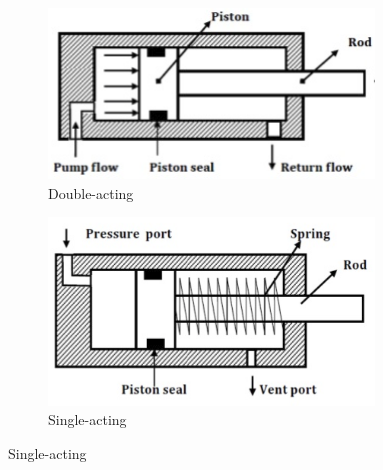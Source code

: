 \begin{figure}[H]
	\begin{subfigure}[b]{.45\linewidth}
		\includegraphics[width=0.95\textwidth]{imgs/piston_doubleact.png}
		\caption{Double-acting}
	\end{subfigure}
	\begin{subfigure}[b]{.45\linewidth}
		\includegraphics[width=0.95\textwidth]{imgs/piston_singleact.png}
		\caption{Single-acting}
	\end{subfigure}
	

\end{figure}

